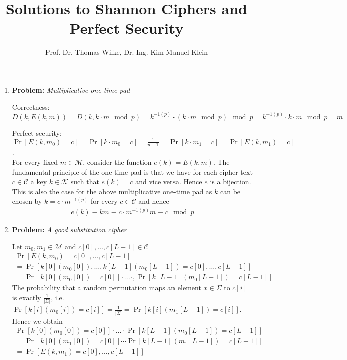 \documentclass[11pt]{article}
\begin{document}
	
	\title{\textbf{Solutions to Shannon Ciphers and Perfect Security}}
	\author{Prof. Dr. Thomas Wilke, Dr.-Ing. Kim-Manuel Klein}
	\maketitle
	\medskip
	
	\begin{enumerate}
		
		\item
	\textbf{Problem:} \textit{Multiplicative one-time pad}
		
	Correctness: $D(k,E(k,m))= D(k,k \cdot m \mod p) = k^{-1 (p)} \cdot (k \cdot m \mod p) \mod p = k^{-1 (p)} \cdot k \cdot m \mod p = m$
	
	
	Perfect security: $\Pr[E(k,m_0) = c] = \Pr[k \cdot m_0 = c] = \frac{1}{p-1} = \Pr[k \cdot m_1 = c] = \Pr[E(k,m_1) = c]$.\\
	
	
	For every fixed $m \in \mathcal{M}$, consider the function $e(k) = E(k,m)$.
	The fundamental principle of the one-time pad is that we have for each cipher text $c \in \mathcal{C}$ a key $k \in \mathcal{K}$ such that $e(k) = c$ and vice versa. Hence $e$ is a bijection. This is also the case for the above multiplicative one-time pad as $k$ can be chosen by $k = c \cdot m^{-1 (p)}$ for every $c \in \mathcal{C}$ and hence
	\begin{align*}
		e(k) \equiv km \equiv c \cdot m^{-1 (p)} m \equiv c \mod p
	\end{align*}
		
	
		\item
       \textbf{Problem:} \textit{A good substitution cipher}
        
         Let $m_0,m_1 \in \mathcal{M}$ and $c[0] , \ldots , c[L-1] \in \mathcal{C}$
        \begin{align*}
        	\Pr[E(k,m_0) = c[0] , \ldots , c[L-1]] \\= \Pr[k[0](m_0[0]), \ldots , k[L-1](m_0[L-1]) = c[0] , \ldots , c[L-1]] \\= \Pr[k[0](m_0[0]) = c[0]] \cdot \ldots \cdot, \Pr[k[L-1](m_0[L-1]) = c[L-1]]
        \end{align*}
        The probability that a random permutation maps an element $x \in \Sigma$ to $c[i]$ is exactly $\frac{1}{|\Sigma|}$, i.e. $\Pr[k[i](m_0[i]) = c[i]] = \frac{1}{|\Sigma|} = \Pr[k[i](m_1[L-1]) = c[i]]$.
        Hence we obtain
        \begin{align*}
        	\Pr[k[0](m_0[0]) = c[0]] \cdot \ldots \cdot \Pr[k[L-1](m_0[L-1]) = c[L-1]] \\
        	= \Pr[k[0](m_1[0]) = c[0]] \cdots \Pr[k[L-1](m_1[L-1]) = c[L-1]] \\
        	= \Pr[E(k,m_1) = c[0] , \ldots , c[L-1]]
        \end{align*}
    

\end{enumerate}
\end{document}
